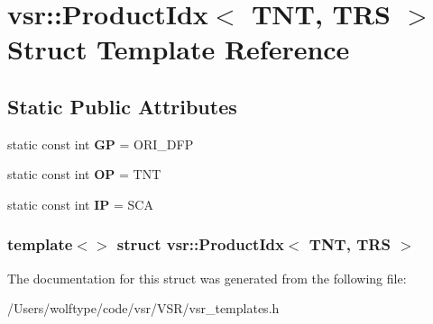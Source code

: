 \hypertarget{structvsr_1_1_product_idx_3_01_t_n_t_00_01_t_r_s_01_4}{\section{vsr\-:\-:Product\-Idx$<$ T\-N\-T, T\-R\-S $>$ Struct Template Reference}
\label{structvsr_1_1_product_idx_3_01_t_n_t_00_01_t_r_s_01_4}
}
\subsection*{Static Public Attributes}
\begin{DoxyCompactItemize}
\item 
\hypertarget{structvsr_1_1_product_idx_3_01_t_n_t_00_01_t_r_s_01_4_a749f3ceafb9e91039fb4a3a707742a4f}{static const int {\bfseries G\-P} = O\-R\-I\-\_\-\-D\-F\-P}\label{structvsr_1_1_product_idx_3_01_t_n_t_00_01_t_r_s_01_4_a749f3ceafb9e91039fb4a3a707742a4f}

\item 
\hypertarget{structvsr_1_1_product_idx_3_01_t_n_t_00_01_t_r_s_01_4_aeaa58ca081cb1789d15bd72382374f10}{static const int {\bfseries O\-P} = T\-N\-T}\label{structvsr_1_1_product_idx_3_01_t_n_t_00_01_t_r_s_01_4_aeaa58ca081cb1789d15bd72382374f10}

\item 
\hypertarget{structvsr_1_1_product_idx_3_01_t_n_t_00_01_t_r_s_01_4_a32a9610e4b5677c227a242086f12d248}{static const int {\bfseries I\-P} = S\-C\-A}\label{structvsr_1_1_product_idx_3_01_t_n_t_00_01_t_r_s_01_4_a32a9610e4b5677c227a242086f12d248}

\end{DoxyCompactItemize}
\subsubsection*{template$<$$>$ struct vsr\-::\-Product\-Idx$<$ T\-N\-T, T\-R\-S $>$}



The documentation for this struct was generated from the following file\-:\begin{DoxyCompactItemize}
\item 
/\-Users/wolftype/code/vsr/\-V\-S\-R/vsr\-\_\-templates.\-h\end{DoxyCompactItemize}
